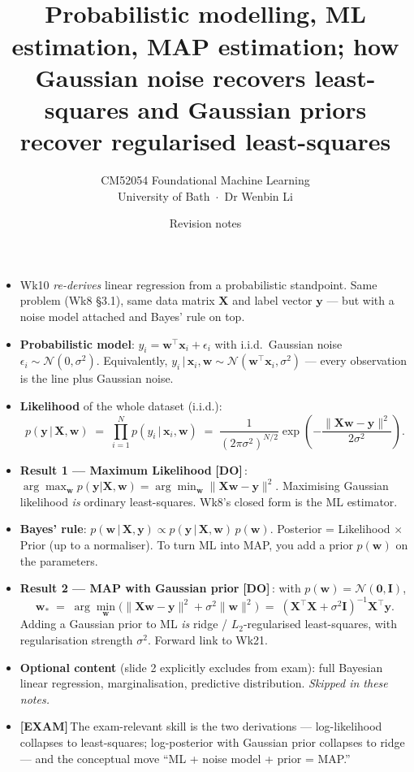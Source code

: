\documentclass[11pt, a4paper]{article}
\title{\vspace{-1cm}{\Huge\bfseries Week 10 — Bayesian Linear Regression} \\[0.4em]{\large Probabilistic modelling, ML estimation, MAP estimation; how Gaussian noise recovers least-squares and Gaussian priors recover regularised least-squares}}
\author{\large CM52054 Foundational Machine Learning \\[0.2em]\normalsize University of Bath \,$\cdot$\, Dr Wenbin Li}
\date{Revision notes}
\newcommand{\examflag}{\textcolor{tipBd}{\textbf{[EXAM]}}\,}
\newcommand{\doflag}{\textcolor{defBd}{\textbf{[DO]}}\,}
\begin{document}
\maketitle
\thispagestyle{empty}\vspace{1em}

\begin{tldrbox}
\begin{itemize}[leftmargin=*]
  \item Wk10 \emph{re-derives} linear regression from a probabilistic standpoint. Same problem (Wk8 §3.1), same data matrix $\mathbf{X}$ and label vector $\mathbf{y}$ — but with a noise model attached and Bayes' rule on top.
  \item \textbf{Probabilistic model}: $y_i = \mathbf{w}^\top\mathbf{x}_i + \epsilon_i$ with i.i.d.\ Gaussian noise $\epsilon_i\sim\mathcal{N}(0,\sigma^2)$. Equivalently, $y_i\,|\,\mathbf{x}_i,\mathbf{w}\sim\mathcal{N}(\mathbf{w}^\top\mathbf{x}_i,\sigma^2)$ — every observation is the line plus Gaussian noise.
  \item \textbf{Likelihood} of the whole dataset (i.i.d.):
  \[
  p(\mathbf{y}\,|\,\mathbf{X},\mathbf{w}) \;=\; \prod_{i=1}^N p(y_i\,|\,\mathbf{x}_i,\mathbf{w})
  \;=\; \frac{1}{(2\pi\sigma^2)^{N/2}}\exp\!\left(-\frac{\|\mathbf{X}\mathbf{w}-\mathbf{y}\|^2}{2\sigma^2}\right).
  \]
  \item \textbf{Result 1 — Maximum Likelihood} \doflag{}: $\arg\max_\mathbf{w} p(\mathbf{y}|\mathbf{X},\mathbf{w}) = \arg\min_\mathbf{w}\|\mathbf{X}\mathbf{w}-\mathbf{y}\|^2$. Maximising Gaussian likelihood \emph{is} ordinary least-squares. Wk8's closed form is the ML estimator.
  \item \textbf{Bayes' rule}: $p(\mathbf{w}\,|\,\mathbf{X},\mathbf{y}) \propto p(\mathbf{y}\,|\,\mathbf{X},\mathbf{w})\,p(\mathbf{w})$. Posterior = Likelihood $\times$ Prior (up to a normaliser). To turn ML into MAP, you add a prior $p(\mathbf{w})$ on the parameters.
  \item \textbf{Result 2 — MAP with Gaussian prior} \doflag{}: with $p(\mathbf{w})=\mathcal{N}(\mathbf{0},\mathbf{I})$,
  \[
  \mathbf{w}_* \;=\; \arg\min_\mathbf{w}\big(\|\mathbf{X}\mathbf{w}-\mathbf{y}\|^2 + \sigma^2\|\mathbf{w}\|^2\big) \;=\; (\mathbf{X}^\top\mathbf{X}+\sigma^2\mathbf{I})^{-1}\mathbf{X}^\top\mathbf{y}.
  \]
  Adding a Gaussian prior to ML \emph{is} ridge / $L_2$-regularised least-squares, with regularisation strength $\sigma^2$. Forward link to Wk21.
  \item \textbf{Optional content} (slide 2 explicitly excludes from exam): full Bayesian linear regression, marginalisation, predictive distribution. \emph{Skipped in these notes.}
  \item \examflag{}The exam-relevant skill is the two derivations — log-likelihood collapses to least-squares; log-posterior with Gaussian prior collapses to ridge — and the conceptual move ``ML + noise model + prior = MAP.''
\end{itemize}
\end{tldrbox}
\end{document}

